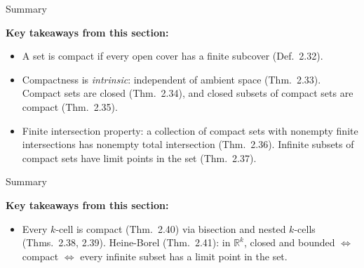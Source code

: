 \documentclass[aspectratio=169,12pt,t]{beamer}
\begin{document}
{%
\begin{frame}{Summary}
  \begin{hlbox}
    \textbf{Key takeaways from this section:}
    \begin{itemize}
      \item A set is \alert{compact} if every open cover has a finite
        subcover (Def.\ 2.32).
      \item Compactness is \emph{intrinsic}: independent of ambient space
        (Thm.\ 2.33). Compact sets are closed (Thm.\ 2.34), and closed
        subsets of compact sets are compact (Thm.\ 2.35).
      \item \alert{Finite intersection property}: a collection of compact sets
        with nonempty finite intersections has nonempty total intersection
        (Thm.\ 2.36). Infinite subsets of compact sets have limit points
        in the set (Thm.\ 2.37).
    \end{itemize}
  \end{hlbox}

\end{frame}

\begin{frame}{Summary}
  \begin{hlbox}
    \textbf{Key takeaways from this section:}
    \begin{itemize}
      \item Every $k$-cell is compact (Thm.\ 2.40) via \alert{bisection} and
        nested $k$-cells (Thms.\ 2.38, 2.39). \alert{Heine-Borel}
        (Thm.\ 2.41): in $\mathbb{R}^k$, closed and bounded $\iff$ compact
        $\iff$ every infinite subset has a limit point in the set.
    \end{itemize}
  \end{hlbox}

\end{frame}

}
\end{document}
